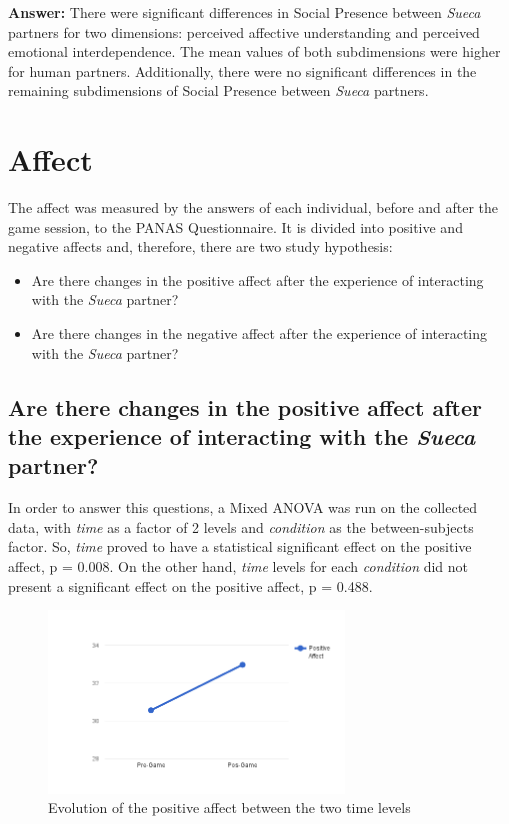 \textbf{Answer:} There were significant differences in Social Presence between \emph{Sueca} partners for two dimensions: perceived affective understanding and perceived emotional interdependence.
The mean values of both subdimensions were higher for human partners.
Additionally, there were no significant differences in the remaining subdimensions of Social Presence between \emph{Sueca} partners.


\section{Affect}
\label{sec:affect}
The affect was measured by the answers of each individual, before and after the game session, to the PANAS Questionnaire.
It is divided into positive and negative affects and, therefore, there are two study hypothesis:
\begin{itemize}
\item Are there changes in the positive affect after the experience of interacting with the \emph{Sueca} partner?
\item Are there changes in the negative affect after the experience of interacting with the \emph{Sueca} partner?
\end{itemize}

\subsection*{Are there changes in the positive affect after the experience of interacting with the \emph{Sueca} partner?}
In order to answer this questions, a Mixed ANOVA was run on the collected data, with \emph{time} as a factor of 2 levels and \emph{condition} as the between-subjects factor.
So, \emph{time} proved to have a statistical significant effect on the positive affect, p = 0.008.
On the other hand, \emph{time} levels for each \emph{condition} did not present a significant effect on the positive affect, p = 0.488.

\begin{figure}[h!]
  \centering
    \includegraphics[width=0.7\textwidth]{./img/7/positiveAffect}
  \caption{Evolution of the positive affect between the two time levels}
\label{fig:positiveAffect}
\end{figure}

